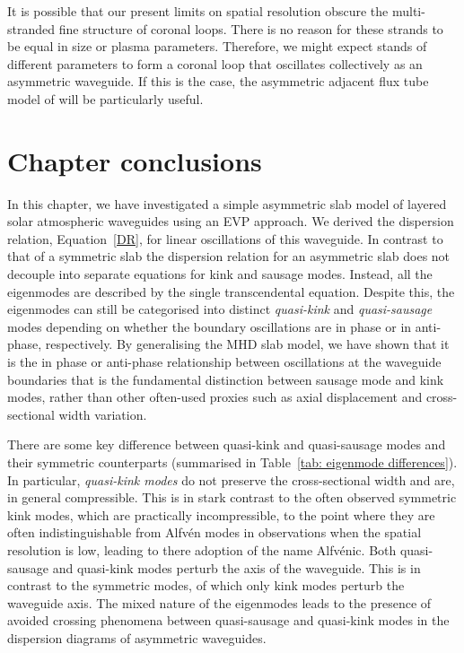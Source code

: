 It is possible that our present limits on spatial resolution obscure the multi-stranded fine structure of coronal loops. There is no reason for these strands to be equal in size or plasma parameters. Therefore, we might expect stands of different parameters to form a coronal loop that oscillates collectively as an asymmetric waveguide. If this is the case, the asymmetric adjacent flux tube model of \cite{van_etal08} will be particularly useful.


\section{Chapter conclusions}
\label{sec: chpt 2 conc}

In this chapter, we have investigated a simple asymmetric slab model of layered solar atmospheric waveguides using an EVP approach. We derived the dispersion relation, Equation~\eqref{DR}, for linear oscillations of this waveguide. In contrast to that of a symmetric slab the dispersion relation for an asymmetric slab does not decouple into separate equations for kink and sausage modes. Instead, all the eigenmodes are described by the single transcendental equation. Despite this, the eigenmodes can still be categorised into distinct \textit{quasi-kink} and \textit{quasi-sausage} modes depending on whether the boundary oscillations are in phase or in anti-phase, respectively. By generalising the MHD slab model, we have shown that it is the in phase or anti-phase relationship between oscillations at the waveguide boundaries that is the fundamental distinction between sausage mode and kink modes, rather than other often-used proxies such as axial displacement and cross-sectional width variation.

There are some key difference between quasi-kink and quasi-sausage modes and their symmetric counterparts (summarised in Table~\ref{tab: eigenmode differences}). In particular, \textit{quasi-kink modes} do not preserve the cross-sectional width and are, in general compressible. This is in stark contrast to the often observed symmetric kink modes, which are practically incompressible, to the point where they are often indistinguishable from Alfv\'{e}n modes in observations when the spatial resolution is low, leading to there adoption of the name Alfv\'{e}nic. Both quasi-sausage and quasi-kink modes perturb the axis of the waveguide. This is in contrast to the symmetric modes, of which only kink modes perturb the waveguide axis. The mixed nature of the eigenmodes leads to the presence of avoided crossing phenomena between quasi-sausage and quasi-kink modes in the dispersion diagrams of asymmetric waveguides.

